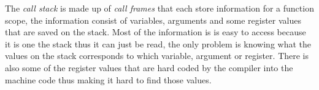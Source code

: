  


The \emph{call stack} is made up of \emph{call frames} that each store information for a function scope, the information consist of variables, arguments and some register values that are saved on the stack.
Most of the information is is easy to access because it is one the stack thus it can just be read, the only problem is knowing what the values on the stack corresponds to which variable, argument or register.
There is also some of the register values that are hard coded by the compiler into the machine code thus making it hard to find those values.


